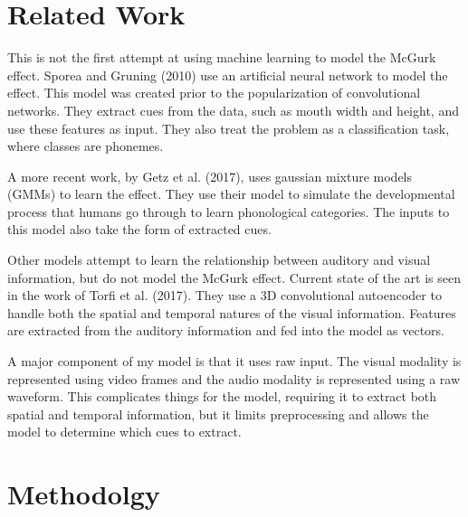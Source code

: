 \documentclass[conference]{IEEEtran}
\begin{document}

\section{Related Work}
This is not the first attempt at using machine learning to model the McGurk effect. Sporea and Gruning (2010) use an artificial neural network to model the effect.\cite{Sporea2010} This model was created prior to the popularization of convolutional networks. They extract cues from the data, such as mouth width and height, and use these features as input. They also treat the problem as a classification task, where classes are phonemes.

A more recent work, by Getz et al. (2017), uses gaussian mixture models (GMMs) to learn the effect.\cite{Getz2017} They use their model to simulate the developmental process that humans go through to learn phonological categories. The inputs to this model also take the form of extracted cues.

Other models attempt to learn the relationship between auditory and visual information, but do not model the McGurk effect. Current state of the art is seen in the work of Torfi et al. (2017).\cite{Torfi2017} They use a 3D convolutional autoencoder to handle both the spatial and temporal natures of the visual information. Features are extracted from the auditory information and fed into the model as vectors.

A major component of my model is that it uses raw input. The visual modality is represented using video frames and the audio modality is represented using a raw waveform. This complicates things for the model, requiring it to extract both spatial and temporal information, but it limits preprocessing and allows the model to determine which cues to extract.

\section{Methodolgy}
\end{document}

